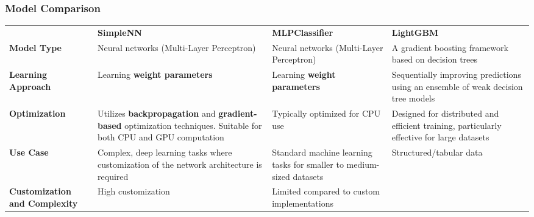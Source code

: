 \documentclass[10pt]{beamer}
\begin{document}
\begin{frame}
\frametitle{Model Comparison}
\begin{table}
\centering
\scriptsize
\begin{tabularx}{\textwidth}{XXXX}
 & \textbf{SimpleNN} & \textbf{MLPClassifier} & \textbf{LightGBM} \\[1.5ex]
\textbf{Model Type} & Neural networks (Multi-Layer Perceptron) & Neural networks (Multi-Layer Perceptron) & A gradient boosting framework based on decision trees \\
\textbf{Learning Approach} & Learning \textbf{weight parameters}  & Learning \textbf{weight parameters}  & Sequentially improving predictions using an ensemble of weak decision tree models \\
\textbf{Optimization} & Utilizes \textbf{backpropagation} and \textbf{gradient-based} optimization techniques. Suitable for both CPU and GPU computation & Typically optimized for CPU use & Designed for distributed and efficient training, particularly effective for large datasets \\
\textbf{Use Case} & Complex, deep learning tasks where customization of the network architecture is required & Standard machine learning tasks for smaller to medium-sized datasets & Structured/tabular data \\
\textbf{Customization and Complexity} & High customization & Limited compared to custom implementations &
\end{tabularx}
\end{table}
\end{frame}
\end{document}
